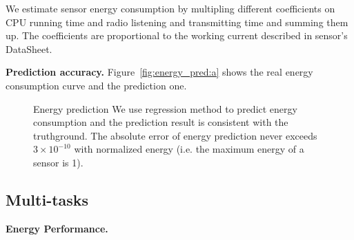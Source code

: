 We estimate sensor energy consumption by multipling different coefficients on
CPU running time and radio listening and transmitting time and summing them up.
The coefficients are proportional to the working current described in sensor's
DataSheet.

\textbf{Prediction accuracy.}
Figure~\ref{fig:energy_pred:a} shows the real energy consumption curve and the
prediction one.

\begin{figure}[htbp]
	\centering
	\hspace{0.1cm}
	\vspace{-0.1in}
	\caption{Energy prediction
		\textnormal{
			We use regression method to predict energy consumption and the
			prediction result is consistent with the truthground.  The absolute
			error of energy prediction never exceeds $3\times10^{-10}$ with normalized energy
			(i.e. the maximum energy of a sensor is 1).
		}
	}
	\label{fig:energy_pred}
\end{figure}

\subsection{Multi-tasks}
\textbf{Energy Performance.}

